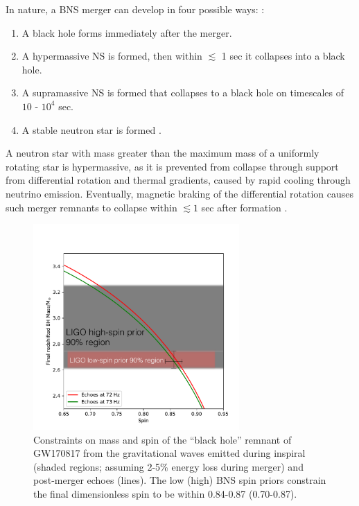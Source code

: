\documentclass[a4paper,11pt]{article}
\begin{document}
In nature, a BNS merger can develop in four possible ways: \cite{Abbott:2017dke}:
\begin{enumerate}
\item A black hole forms immediately after the merger.

\item A hypermassive NS is formed, then within $\lesssim$ 1 sec it collapses into a black hole.

\item A supramassive NS is formed that collapses to a black hole on timescales of $10$ - $10^{4}$ sec.

\item A stable neutron star is formed \cite{TheLIGOScientific:2017qsa}.

\end{enumerate}


A neutron star with mass greater than the maximum mass of a uniformly rotating star is hypermassive, as it is prevented from collapse through support from differential rotation and thermal gradients, caused by rapid cooling through neutrino emission.  
Eventually, magnetic braking of the differential rotation causes  such merger remnants to collapse within $\lesssim 1$  sec after formation \cite{Shapiro:2000zh,Hotokezaka:2013iia}.

\begin{figure}[!tbp]
\centering
    \includegraphics[width=0.7\textwidth]{Mass_Spin.pdf}
 \caption{Constraints on mass and spin of the ``black hole'' remnant of GW170817 from the gravitational waves emitted during inspiral (shaded regions; assuming 2-5\% energy loss during merger) and post-merger echoes (lines). The low (high) BNS spin priors constrain the final dimensionless spin to be within 0.84-0.87 (0.70-0.87). }
 \label{NS-NS_12}
\end{figure}
\end{document}
